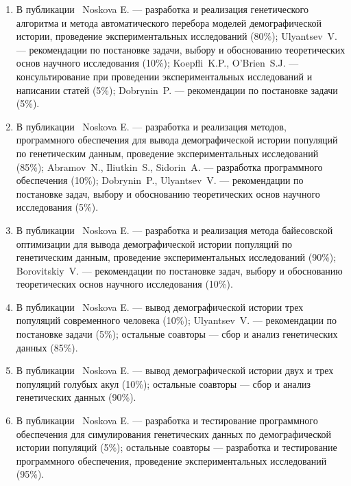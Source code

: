 \begin{enumerate}[label=\arabic*.]
    \item 
    В публикации~\cite{noskova2020gadma} Noskova E. --- разработка и реализация генетического алгоритма и метода автоматического перебора моделей демографической истории, проведение экспериментальных исследований (80\%); Ulyantsev~V. --- рекомендации по постановке задачи, выбору и обоснованию теоретических основ научного исследования (10\%); Koepfli~K.P., O’Brien~S.J. ---  консультирование при проведении экспериментальных исследований и написании статей (5\%); Dobrynin~P. --- рекомендации по постановке задачи (5\%).

    \item %
    В публикации~\cite{noskova2023gadma2} Noskova E. --- разработка и реализация методов, программного обеспечения для вывода демографической истории популяций по генетическим данным, проведение экспериментальных исследований (85\%); Abramov~N., Iliutkin~S., Sidorin~A. --- разработка программного обеспечения (10\%); Dobrynin~P., Ulyantsev~V. --- рекомендации по постановке задач, выбору и обоснованию теоретических основ научного исследования (5\%).

    \item %
    В публикации~\cite{noskova2023bayesian} Noskova E. --- разработка и реализация метода байесовской оптимизации для вывода демографической истории популяций по генетическим данным, проведение экспериментальных исследований (90\%); Borovitskiy~V. ---  рекомендации по постановке задач, выбору и обоснованию теоретических основ научного исследования (10\%).

    \item %
    В публикации~\cite{zhernakova2020genome} Noskova E. --- вывод демографической истории трех популяций современного человека (10\%); Ulyantsev~V. --- рекомендации по постановке задачи (5\%); остальные соавторы --- сбор и анализ генетических данных (85\%).

    \item %
    В публикации~\cite{nikolic2022stepping} Noskova E. --- вывод демографической истории двух и трех популяций голубых акул (10\%); остальные соавторы --- сбор и анализ генетических данных (90\%).

    \item %
    В публикации~\cite{adrion2020community} Noskova E. --- разработка и тестирование программного обеспечения для симулирования генетических данных по демографической истории популяций (5\%); остальные соавторы --- разработка и тестирование программного обеспечения, проведение экспериментальных исследований (95\%).


\end{enumerate}
